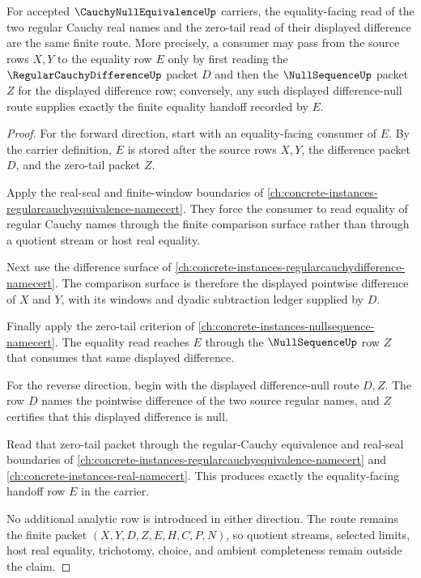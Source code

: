 \begin{theorem}
\label{thm:cauchy-null-equivalence-difference-zero-route}
For accepted $\CauchyNullEquivalenceUp$ carriers, the equality-facing read of the two regular Cauchy real names and the zero-tail read of their displayed difference are the same finite route. More precisely, a consumer may pass from the source rows $X,Y$ to the equality row $E$ only by first reading the $\RegularCauchyDifferenceUp$ packet $D$ and then the $\NullSequenceUp$ packet $Z$ for the displayed difference row; conversely, any such displayed difference-null route supplies exactly the finite equality handoff recorded by $E$.
\end{theorem}
\begin{proof}
For the forward direction, start with an equality-facing consumer of $E$. By the carrier definition, $E$ is stored after the source rows $X,Y$, the difference packet $D$, and the zero-tail packet $Z$.

Apply the real-seal and finite-window boundaries of \autoref{ch:concrete-instances-regularcauchyequivalence-namecert}. They force the consumer to read equality of regular Cauchy names through the finite comparison surface rather than through a quotient stream or host real equality.

Next use the difference surface of \autoref{ch:concrete-instances-regularcauchydifference-namecert}. The comparison surface is therefore the displayed pointwise difference of $X$ and $Y$, with its windows and dyadic subtraction ledger supplied by $D$.

Finally apply the zero-tail criterion of \autoref{ch:concrete-instances-nullsequence-namecert}. The equality read reaches $E$ through the $\NullSequenceUp$ row $Z$ that consumes that same displayed difference.

For the reverse direction, begin with the displayed difference-null route $D,Z$. The row $D$ names the pointwise difference of the two source regular names, and $Z$ certifies that this displayed difference is null.

Read that zero-tail packet through the regular-Cauchy equivalence and real-seal boundaries of \autoref{ch:concrete-instances-regularcauchyequivalence-namecert} and \autoref{ch:concrete-instances-real-namecert}. This produces exactly the equality-facing handoff row $E$ in the carrier.

No additional analytic row is introduced in either direction. The route remains the finite packet $(X,Y,D,Z,E,H,C,P,N)$, so quotient streams, selected limits, host real equality, trichotomy, choice, and ambient completeness remain outside the claim.
\end{proof}

